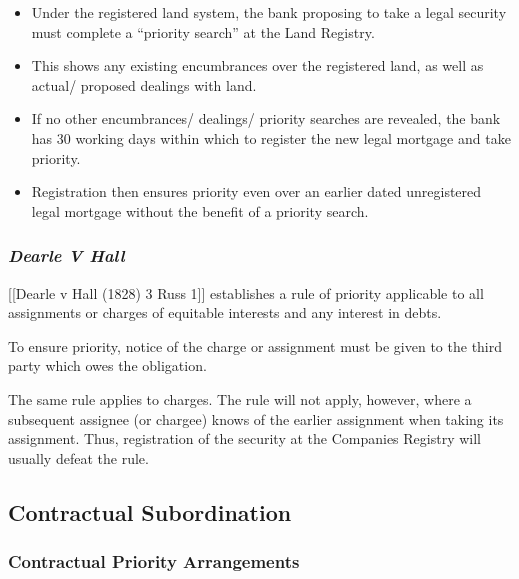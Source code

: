 \documentclass[
]{article}
\newenvironment{Shaded}{}{}
\newcommand{\NormalTok}[1]{#1}
\providecommand{\tightlist}{%
  \setlength{\itemsep}{0pt}\setlength{\parskip}{0pt}}
\begin{document}
\begin{itemize}
\tightlist
\item
  Under the registered land system, the bank proposing to take a legal
  security must complete a ``priority search'' at the Land Registry.
\item
  This shows any existing encumbrances over the registered land, as well
  as actual/ proposed dealings with land.
\item
  If no other encumbrances/ dealings/ priority searches are revealed,
  the bank has 30 working days within which to register the new legal
  mortgage and take priority.
\item
  Registration then ensures priority even over an earlier dated
  unregistered legal mortgage without the benefit of a priority search.
\end{itemize}

\hypertarget{dearle-v-hall}{%
\subsubsection{\texorpdfstring{\emph{Dearle V
Hall}}{Dearle V Hall}}\label{dearle-v-hall}}

{[}{[}Dearle v Hall (1828) 3 Russ 1{]}{]} establishes a rule of priority
applicable to all assignments or charges of equitable interests and any
interest in debts.

\begin{Shaded}
\begin{Highlighting}[]
\NormalTok{To ensure priority, notice of the charge or assignment must be given to the third party which owes the obligation.}
\end{Highlighting}
\end{Shaded}

The same rule applies to charges. The rule will not apply, however,
where a subsequent assignee (or chargee) knows of the earlier assignment
when taking its assignment. Thus, registration of the security at the
Companies Registry will usually defeat the rule.

\hypertarget{contractual-subordination}{%
\subsection{Contractual Subordination}\label{contractual-subordination}}

\hypertarget{contractual-priority-arrangements}{%
\subsubsection{Contractual Priority
Arrangements}\label{contractual-priority-arrangements}}
\end{document}
